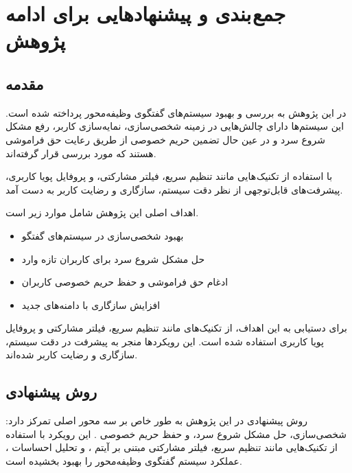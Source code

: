 \chapter{جمع بندی و پیشنهادهایی برای ادامه پژوهش}
\section{مقدمه}

در این پژوهش به بررسی و بهبود سیستم‌های گفتگوی وظیفه‌محور پرداخته شده است. این سیستم‌ها دارای چالش‌هایی در زمینه شخصی‌سازی، نمایه‌سازی کاربر، رفع مشکل شروع سرد و در عین حال تضمین حریم خصوصی از طریق رعایت حق فراموشی هستند که مورد بررسی قرار گرفته‌اند.

با استفاده از تکنیک هایی مانند تنظیم سریع، فیلتر مشارکتی، و پروفایل پویا کاربری، پیشرفت‌های قابل‌توجهی از نظر دقت سیستم، سازگاری و رضایت کاربر به دست آمد.

اهداف اصلی این پژوهش شامل موارد زیر است.

\begin{itemize}
\item
بهبود شخصی‌سازی در سیستم‌های گفتگو
\item 
حل مشکل شروع سرد برای کاربران تازه وارد
\item    
ادغام حق فراموشی و حفظ حریم خصوصی کاربران
\item    
افزایش سازگاری با دامنه‌های جدید
\end{itemize}
برای دستیابی به این اهداف، از تکنیک‌های مانند تنظیم سریع، فیلتر مشارکتی و پروفایل پویا کاربری استفاده شده است. این رویکردها منجر به پیشرفت‌ در دقت سیستم، سازگاری و رضایت کاربر شده‌اند.

\section{روش پیشنهادی}
روش پیشنهادی در این پژوهش به طور خاص بر سه محور اصلی تمرکز دارد: شخصی‌سازی، حل مشکل شروع سرد، و حفظ حریم خصوصی . این رویکرد با استفاده از تکنیک‌هایی مانند تنظیم سریع، فیلتر مشارکتی مبتنی بر آیتم ، و تحلیل احساسات ، عملکرد سیستم گفتگوی وظیفه‌محور را بهبود بخشیده است.

